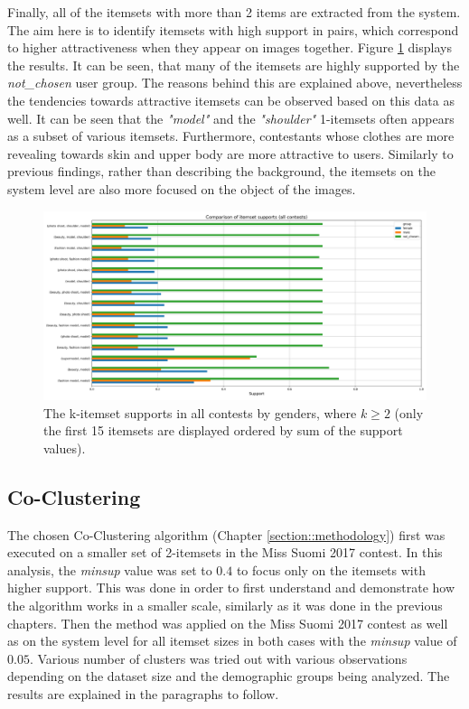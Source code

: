 Finally, all of the itemsets with more than 2 items are extracted from the system. The aim here is to identify itemsets with high support in pairs, which correspond to higher attractiveness when they appear on images together. Figure \ref{itemset_supports-gender-all_contests-over2_itemset} displays the results. It can be seen, that many of the itemsets are highly supported by the \emph{not\_chosen} user group. The reasons behind this are explained above, nevertheless the tendencies towards attractive itemsets can be observed based on this data as well. It can be seen that the \emph{"{model}"} and the \emph{"{shoulder}"} 1-itemsets often appears as a subset of various itemsets. Furthermore, contestants whose clothes are more revealing towards skin and upper body are more attractive to users. Similarly to previous findings, rather than describing the background, the itemsets on the system level are also more focused on the object of the images. 

\begin{figure}[h] 
    \begin{center}
        \includegraphics[width=1.0\textwidth]{Images/itemset_supports-gender-all_contests-over2_itemset.png}
        \caption{The k-itemset supports in all contests by genders, where $k \geq 2$ (only the first 15 itemsets are displayed ordered by sum of the support values).}
        \label{itemset_supports-gender-all_contests-over2_itemset}
    \end{center}
\end{figure}

\subsection{Co-Clustering}
The chosen Co-Clustering algorithm (Chapter \ref{section::methodology}) first was executed on a smaller set of 2-itemsets in the Miss Suomi 2017 contest. In this analysis, the \emph{minsup} value was set to $0.4$ to focus only on the itemsets with higher support. This was done in order to first understand and demonstrate how the algorithm works in a smaller scale, similarly as it was done in the previous chapters. Then the method was applied on the Miss Suomi 2017 contest as well as on the system level for all itemset sizes in both cases with the \emph{minsup} value of $0.05$. Various number of clusters was tried out with various observations depending on the dataset size and the demographic groups being analyzed. The results are explained in the paragraphs to follow. 

